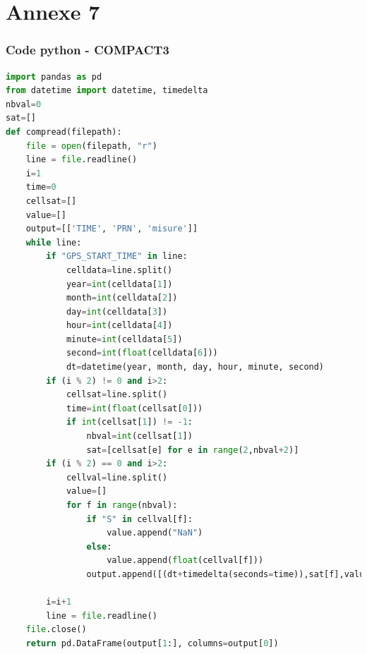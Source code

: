 \documentclass[xcolor=dvipsnames,envcountsect]{beamer}
\begin{document}
\section{Annexe 7}
\begin{frame}
	\frametitle{Code python - COMPACT3}
	\noindent
	\begin{lstlisting}[language=Python,basicstyle=\tiny]
import pandas as pd
from datetime import datetime, timedelta
nbval=0
sat=[]
def compread(filepath):
	file = open(filepath, "r")
	line = file.readline()
	i=1
	time=0
	cellsat=[]
	value=[]
	output=[['TIME', 'PRN', 'misure']]
	while line:
		if "GPS_START_TIME" in line:
			celldata=line.split()
			year=int(celldata[1])
			month=int(celldata[2])
			day=int(celldata[3])
			hour=int(celldata[4])
			minute=int(celldata[5])
			second=int(float(celldata[6]))
			dt=datetime(year, month, day, hour, minute, second)
		if (i % 2) != 0 and i>2:
			cellsat=line.split()
			time=int(float(cellsat[0]))
			if int(cellsat[1]) != -1:
				nbval=int(cellsat[1])
				sat=[cellsat[e] for e in range(2,nbval+2)]
		if (i % 2) == 0 and i>2:
			cellval=line.split()
			value=[]
			for f in range(nbval):
				if "S" in cellval[f]:
					value.append("NaN")
				else:
					value.append(float(cellval[f]))
				output.append([(dt+timedelta(seconds=time)),sat[f],value[f]])
		
		i=i+1
		line = file.readline()
	file.close()   
	return pd.DataFrame(output[1:], columns=output[0])
	\end{lstlisting}
\end{frame}
\end{document}

